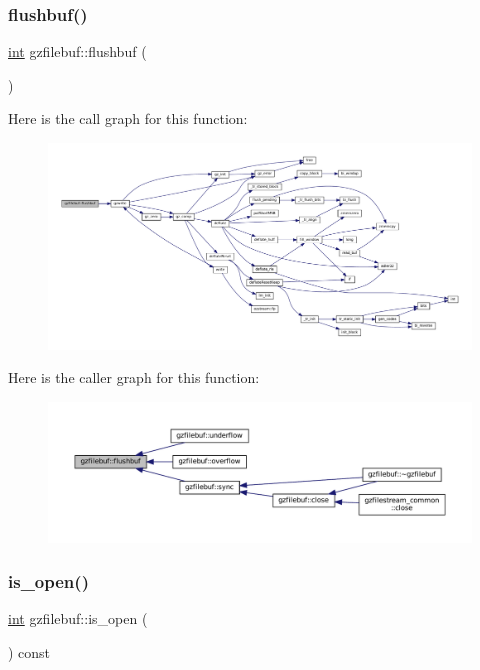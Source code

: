 \subsubsection{\texorpdfstring{flushbuf()}{flushbuf()}}
{\footnotesize\ttfamily \mbox{\hyperlink{ioapi_8h_a787fa3cf048117ba7123753c1e74fcd6}{int}} gzfilebuf\+::flushbuf (\begin{DoxyParamCaption}{ }\end{DoxyParamCaption})\hspace{0.3cm}{\ttfamily [private]}}

Here is the call graph for this function\+:
\nopagebreak
\begin{figure}[H]
\begin{center}
\leavevmode
\includegraphics[width=350pt]{classgzfilebuf_aa425fda69e0eb2c94231399652491ff0_cgraph}
\end{center}
\end{figure}
Here is the caller graph for this function\+:
\nopagebreak
\begin{figure}[H]
\begin{center}
\leavevmode
\includegraphics[width=350pt]{classgzfilebuf_aa425fda69e0eb2c94231399652491ff0_icgraph}
\end{center}
\end{figure}
\mbox{\label{classgzfilebuf_af2619b96e3ddea9050be70dd21de4752}} 
\subsubsection{\texorpdfstring{is\+\_\+open()}{is\_open()}\hspace{0.1cm}{\footnotesize\ttfamily [1/2]}}
{\footnotesize\ttfamily \mbox{\hyperlink{ioapi_8h_a787fa3cf048117ba7123753c1e74fcd6}{int}} gzfilebuf\+::is\+\_\+open (\begin{DoxyParamCaption}{ }\end{DoxyParamCaption}) const\hspace{0.3cm}{\ttfamily [inline]}}

